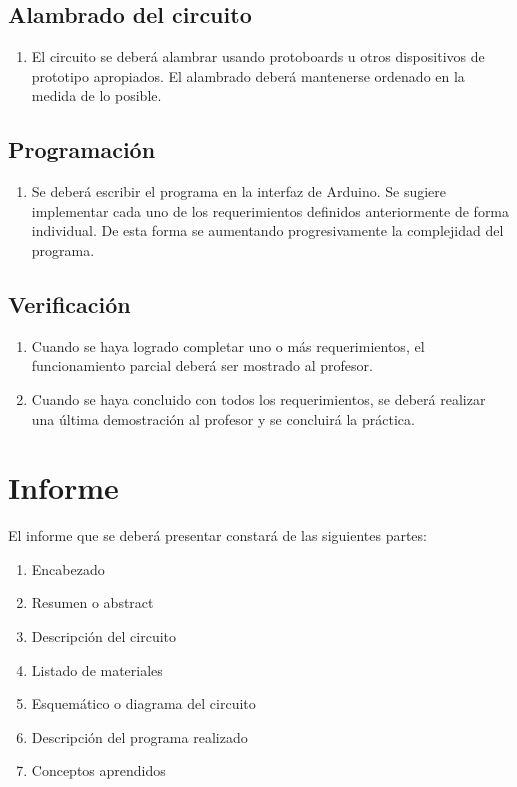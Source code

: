 \documentclass[12pt,letterpaper]{IEEEtran}
\begin{document}
\subsection{Alambrado del circuito}

\begin{enumerate}[resume]
	\item El circuito se deberá alambrar usando protoboards u otros dispositivos de prototipo apropiados. El alambrado deberá mantenerse ordenado en la medida de lo posible.
\end{enumerate}

\subsection{Programación}

\begin{enumerate}[resume]
	\item Se deberá escribir el programa en la interfaz de Arduino. Se sugiere implementar cada uno de los requerimientos definidos anteriormente de forma individual. De esta forma se aumentando progresivamente la complejidad del programa.
\end{enumerate}

\subsection{Verificación}

\begin{enumerate}[resume]
	\item Cuando se haya logrado completar uno o más requerimientos, el funcionamiento parcial deberá ser mostrado al profesor.
	\item Cuando se haya concluido con todos los requerimientos, se deberá realizar una última demostración al profesor y se concluirá la práctica.
\end{enumerate}


\section{Informe}

El informe que se deberá presentar constará de las siguientes partes:

\begin{enumerate}
  \item Encabezado
  \item Resumen o abstract
  \item Descripción del circuito
  \item Listado de materiales
  \item Esquemático o diagrama del circuito
  \item Descripción del programa realizado
  \item Conceptos aprendidos
\end{enumerate}
\end{document}
